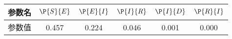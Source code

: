 \begin{tabular}{cccccc}
\hline
参数名&$\P{S}{E}$&$\P{E}{I}$&$\P{I}{R}$&$\P{I}{D}$&$\P{R}{I}$\\
\hline
参数值&0.457&0.224&0.046&0.001&0.000\\
\hline
\end{tabular}